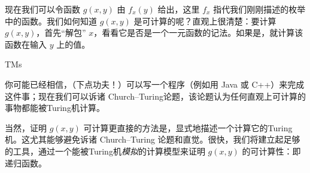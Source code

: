 \documentclass[../../../include/open-logic-section]{subfiles}
\begin{document}
现在我们可以令函数 $g(x,y)$ 由 $f_x(y)$ 给出，这里 $f_x$ 指代我们刚刚描述的枚举中的函数。我们如何知道 $g(x,y)$ 是可计算的呢？直观上很清楚：要计算 $g(x,y)$，首先“解包” $x$，看看它是否是一个一元函数的记法。如果是，就计算该函数在输入 $y$ 上的值。

\begin{tagblock}{TMs}
\begin{digress}
你可能已经相信，（下点功夫！）可以写一个程序（例如用 Java 或 C++）来完成这件事；现在我们可以诉诸 Church--Turing论题，该论题认为任何直观上可计算的事物都能被Turing机计算。

当然，证明 $g(x,y)$ 可计算更直接的方法是，显式地描述一个计算它的Turing机。这尤其能够避免诉诸 Church--Turing 论题和直觉。很快，我们将建立起足够的工具，通过一个能被Turing机\emph{模拟}的计算模型来证明 $g(x,y)$ 的可计算性：即递归函数。
\end{digress}
\end{tagblock}
\end{document}

